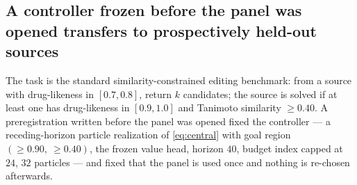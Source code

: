 \subsection{A controller frozen before the panel was opened transfers to prospectively held-out sources}
\label{sec:exp-competence}



The task is the standard similarity-constrained editing benchmark: from a source with drug-likeness in $[0.7,0.8]$, return $k$ candidates; the source is solved if at least one has drug-likeness in $[0.9,1.0]$ and Tanimoto similarity $\ge0.40$.
A preregistration written before the panel was opened fixed the controller --- a receding-horizon particle realization of \eqref{eq:central} with goal region $(\ge0.90,\ \ge0.40)$, the frozen value head, horizon $40$, budget index capped at $24$, $32$ particles --- and fixed that the panel is used once and nothing is re-chosen afterwards.

